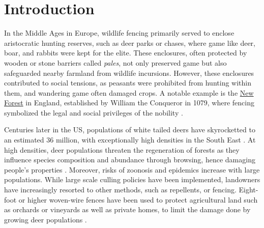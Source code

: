 \clearpage
\onehalfspacing
\section{Introduction}

In the Middle Ages in Europe, wildlife fencing primarily served to enclose aristocratic hunting reserves, such as deer parks or chases, where game like deer, boar, and rabbits were kept for the elite. These enclosures, often protected by wooden or stone barriers called \textit{pales}, not only preserved game but also safeguarded nearby farmland from wildlife incursions. However, these enclosures contributed to social tensions, as peasants were prohibited from hunting within them, and wandering game often damaged crops. A notable example is the \href{https://www.nationaltrust.org.uk/visit/hampshire/new-forest-northern-commons/the-history-of-the-new-forest}{New Forest} in England, established by William the Conqueror in 1079, where fencing symbolized the legal and social privileges of the nobility \citep{rackham_history_1987}. 

Centuries later in the US, populations of white tailed deers have skyrocketted to an estimated 36 million, with exceptionally high densities in the South East \citep{hanberry_regaining_2020}. At high densities, deer populations threaten the regeneration of forests as they influence species composition and abundance through browsing, hence damaging people's properties \citep{hanberry_does_2019}. Moreover, risks of zoonosis and epidemics increase with large populations. While large scale culling policies have been implemented, landowners have increasingly resorted to other methods, such as repellents, or fencing. Eight-foot or higher woven-wire fences have been used to protect agricultural land such as orchards or vineyards as well as private homes, to limit the damage done by growing deer populations \citep{caslick_economic_1979}.

